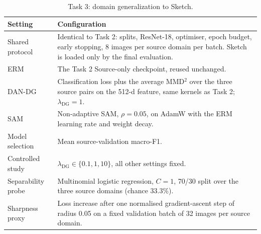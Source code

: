 \begin{table}[h]
  \caption{Task 3: domain generalization to Sketch.}
  \label{tab:setup_task3}
  \centering
  \small
  \begin{tabular}{@{}p{}p{}@{}}
    \toprule
    \textbf{Setting} & \textbf{Configuration} \\
    \midrule
    Shared protocol & Identical to Task 2: splits, ResNet-18, optimiser, epoch budget, early stopping, 8 images per source domain per batch. Sketch is loaded only by the final evaluation. \\
    ERM & The Task 2 Source-only checkpoint, reused unchanged. \\
    DAN-DG & Classification loss plus the average MMD$^2$ over the three source pairs on the 512-d feature, same kernels as Task 2; $\lambda_{\mathrm{DG}}=1$. \\
    SAM & Non-adaptive SAM, $\rho=0.05$, on AdamW with the ERM learning rate and weight decay. \\
    Model selection & Mean source-validation macro-F1. \\
    Controlled study & $\lambda_{\mathrm{DG}}\in\{0.1, 1, 10\}$, all other settings fixed. \\
    Separability probe & Multinomial logistic regression, $C=1$, 70/30 split over the three source domains (chance 33.3\%). \\
    Sharpness proxy & Loss increase after one normalised gradient-ascent step of radius 0.05 on a fixed validation batch of 32 images per source domain. \\
    \bottomrule
  \end{tabular}
\end{table}

